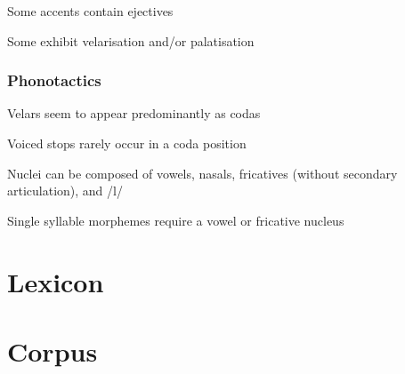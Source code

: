 \documentclass{memoir}
\begin{document}
Some accents contain ejectives

Some exhibit velarisation and/or palatisation

\section{Phonotactics}

Velars seem to appear predominantly as codas

Voiced stops rarely occur in a coda position

Nuclei can be composed of vowels, nasals, fricatives (without secondary articulation), and /l/

Single syllable morphemes require a vowel or fricative nucleus


\part{Lexicon}

\part{Corpus}

\backmatter
\printindex
\end{document}
